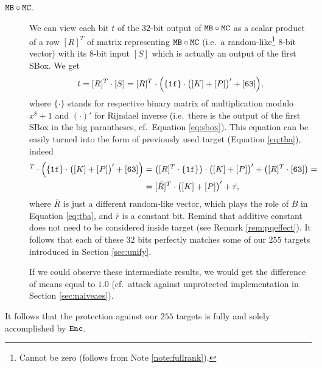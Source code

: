 \begin{description}
	\item[$\texttt{MB}\circ\texttt{MC}$.] We can view each bit $t$ of the $32$-bit output of $\texttt{MB}\circ\texttt{MC}$ as a scalar product of a row $[R]^T$ of matrix representing $\texttt{MB}\circ\texttt{MC}$ (i.e.\ a random-like\footnote{Cannot be zero (follows from Note \ref{note:fullrank}).} $8$-bit vector) with its $8$-bit input $[S]$ which is actually an output of the first SBox. We get
	\begin{equation}
		t = [R]^T\cdot [S] = [R]^T\cdot\Bigl( \{\texttt{1f}\}\cdot\bigl([K]+[P]\bigr)' + [\texttt{63}] \Bigr) ,
	\end{equation}
	where $\{\cdot\}$ stands for respective binary matrix of multiplication modulo $x^8+1$ and $(\cdot)'$ for Rijndael inverse (i.e.\ there is the output of the first SBox in the big parantheses, cf.\ Equation \ref{eq:sbox}). This equation can be easily turned into the form of previously used target (Equation \ref{eq:tba}), indeed
	\begin{align*}
		[R]^T\cdot\Bigl( \{\texttt{1f}\}\cdot\bigl([K]+[P]\bigr)' + [\texttt{63}] \Bigr) &= \bigl([R]^T\cdot \{\texttt{1f}\}\bigr)\cdot\bigl([K]+[P]\bigr)' + \bigl([R]^T\cdot [\texttt{63}]\bigr) = \\
		&= [\bar R]^T \cdot \bigl([K]+[P]\bigr)' + \bar r ,
	\end{align*}
	where $\bar R$ is just a different random-like vector, which plays the role of $B$ in Equation \ref{eq:tba}, and $\bar r$ is a constant bit. Remind that additive constant does not need to be considered inside target (see Remark \ref{rem:pqeffect}). It follows that each of these $32$ bits perfectly matches some of our $255$ targets introduced in Section \ref{sec:unify}.
	
	If we could observe these intermediate results, we would get the difference of means equal to $1.0$ (cf.\ attack against unprotected implementation in Section \ref{sec:naiveaes}).
\end{description}
\begin{remark}
\label{rem:enc}
	It follows that the protection against our $255$ targets is fully and solely accomplished by $\texttt{Enc}$.
\end{remark}
